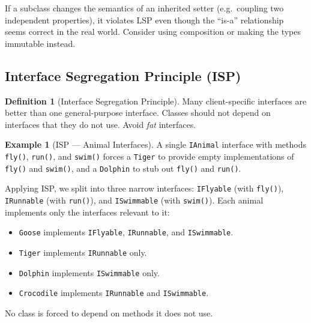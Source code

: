 \documentclass[11pt, a4paper, notitlepage]{report}
\theoremstyle{definition}
\newtheorem{definition}[theorem]{Definition}
\theoremstyle{remark}
\theoremstyle{definition}
\newtheorem{example}[theorem]{Example}
\begin{document}
\begin{warning}[title={Warning: LSP and Mutability}]
  If a subclass changes the semantics of an inherited setter (e.g.\ coupling two
  independent properties), it violates LSP even though the ``is-a'' relationship
  seems correct in the real world. Consider using composition or making the types
  immutable instead.
\end{warning}

\subsection{Interface Segregation Principle (ISP)}
\label{subsec:ch9-isp}

\begin{definition}[Interface Segregation Principle]
\label{def:ch9-isp}
Many client-specific interfaces are better than one general-purpose interface.
Classes should not depend on interfaces that they do not use. Avoid \emph{fat}
interfaces.
\end{definition}

\begin{example}[ISP --- Animal Interfaces]
\label{ex:ch9-isp-animal}
A single \texttt{IAnimal} interface with methods \texttt{fly()}, \texttt{run()}, and
\texttt{swim()} forces a \texttt{Tiger} to provide empty implementations of
\texttt{fly()} and \texttt{swim()}, and a \texttt{Dolphin} to stub out \texttt{fly()}
and \texttt{run()}.

Applying ISP, we split into three narrow interfaces: \texttt{IFlyable} (with
\texttt{fly()}), \texttt{IRunnable} (with \texttt{run()}), and \texttt{ISwimmable}
(with \texttt{swim()}). Each animal implements only the interfaces relevant to it:
\begin{itemize}
  \item \texttt{Goose} implements \texttt{IFlyable}, \texttt{IRunnable}, and
        \texttt{ISwimmable}.
  \item \texttt{Tiger} implements \texttt{IRunnable} only.
  \item \texttt{Dolphin} implements \texttt{ISwimmable} only.
  \item \texttt{Crocodile} implements \texttt{IRunnable} and \texttt{ISwimmable}.
\end{itemize}
No class is forced to depend on methods it does not use.
\end{example}

\end{document}
